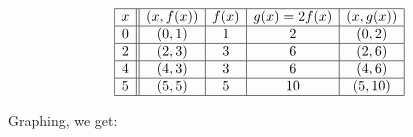 \documentclass{ximera}
\begin{document}
\begin{center}
\[ \begin{array}{|c||c|c|c|c|}  

\hline

 x & (x,f(x)) & f(x) & g(x)=2f(x) & (x, g(x)) \\ \hline
0  & (0,1)& 1 & 2 &(0, 2) \\  \hline
2 & (2,3) & 3 &  6 &(2,6) \\  \hline
4 & (4,3) & 3 &  6 &(4, 6) \\  \hline
5 & (5,5) & 5 &  10 &( 5 ,10) \\  \hline

\end{array} \] 


\end{center}

Graphing, we get:
\end{document}
